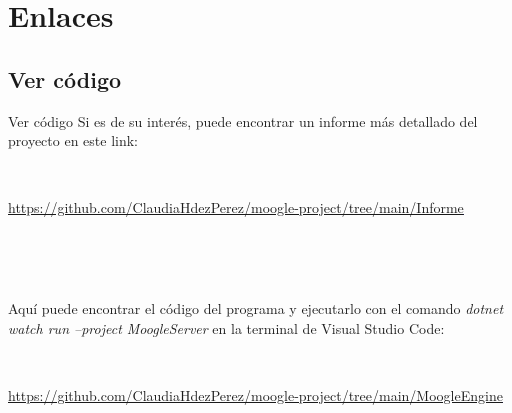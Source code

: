 \section{Enlaces}

\subsection{Ver código}
\begin{frame}{Ver código}
    Si es de su interés, puede encontrar un informe más detallado del proyecto en este link:

    \

    \textcolor{blue}{\underline{\scriptsize {\url{https://github.com/ClaudiaHdezPerez/moogle-project/tree/main/Informe}}}}

    \

    \

    Aquí puede encontrar el código del programa y ejecutarlo con el comando \textit{dotnet watch run --project MoogleServer} en la terminal de Visual Studio Code:

    \

    \textcolor{blue}{\underline{\scriptsize {\url{https://github.com/ClaudiaHdezPerez/moogle-project/tree/main/MoogleEngine}}}}
\end{frame}